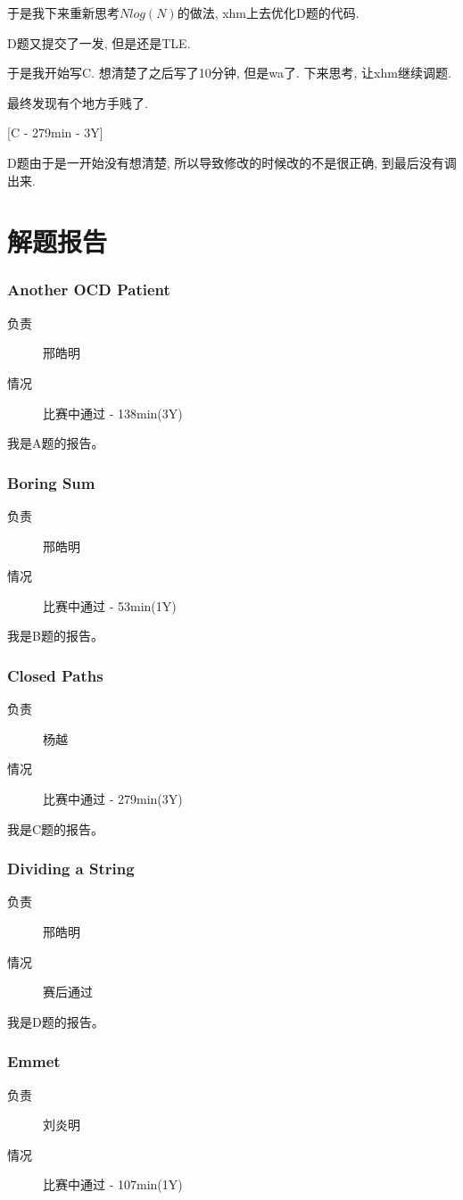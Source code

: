 \documentclass[a4paper, 11pt, nofonts, nocap, fancyhdr]{ctexart}
\newcommand{\problem}[1]{\subsubsection{#1}}
\begin{document}
于是我下来重新思考$Nlog(N)$的做法, xhm上去优化D题的代码.

D题又提交了一发, 但是还是TLE.

于是我开始写C. 想清楚了之后写了10分钟, 但是wa了. 下来思考, 让xhm继续调题.

最终发现有个地方手贱了.

[C - 279min - 3Y]

D题由于是一开始没有想清楚, 所以导致修改的时候改的不是很正确, 到最后没有调出来.

\section{解题报告}

\problem{Another OCD Patient}

\begin{description}
\item[负责] 邢皓明
\item[情况] 比赛中通过 - 138min(3Y)
\end{description}

我是A题的报告。

\problem{Boring Sum}

\begin{description}
\item[负责] 邢皓明
\item[情况] 比赛中通过 - 53min(1Y)
\end{description}

我是B题的报告。

\problem{Closed Paths}

\begin{description}
\item[负责] 杨越
\item[情况] 比赛中通过 - 279min(3Y)
\end{description}

我是C题的报告。

\problem{Dividing a String}

\begin{description}
\item[负责] 邢皓明
\item[情况] 赛后通过
\end{description}

我是D题的报告。

\problem{Emmet}

\begin{description}
\item[负责] 刘炎明
\item[情况] 比赛中通过 - 107min(1Y)
\end{description}
\end{document}

